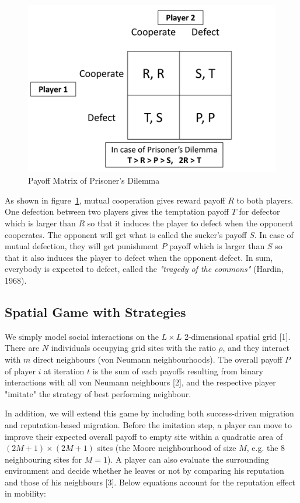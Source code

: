 \documentclass[11pt]{article}
\begin{document}
\begin{figure}[!htbp]
	\centering
	\includegraphics[scale=0.75]{../../other/pd_payoff_matrix.png}
    \caption{Payoff Matrix of Prisoner's Dilemma}
    \label{fig:paymatrix}
\end{figure}

\newpage
As shown in figure~\ref{fig:paymatrix}, mutual cooperation gives reward payoff $R$ to both players. One defection between two players gives the temptation payoff $T$ for defector which is larger than $R$ so that it induces the player to defect when the opponent cooperates. The opponent will get what is called the sucker's payoff $S$. In case of mutual defection, they will get punishment $P$ payoff which is larger than $S$ so that it also induces the player to defect when the opponent defect. In sum, everybody is expected to defect, called the \textit{"tragedy of the commons"} (Hardin, 1968).


\subsection{Spatial Game with Strategies}

We simply model social interactions on the $L \times L$ 2-dimensional spatial grid [1]. There are $N$ individuals occupying grid sites with the ratio $\rho$, and they interact with $m$ direct neighbours (von Neumann neighbourhoods). The overall payoff $P$ of player $i$ at iteration $t$ is the sum of each payoffs resulting from binary interactions with all von Neumann neighbours [2], and the respective player "imitate" the strategy of best performing neighbour.

In addition, we will extend this game by including both success-driven migration and reputation-based migration. Before the imitation step, a player can move to improve their expected overall payoff to empty site within a quadratic area of $(2M+1) \times (2M+1)$ sites (the Moore neighbourhood of size $M$, e.g. the 8 neighbouring sites for $M = 1$). A player can also evaluate the surrounding environment and decide whether he leaves or not by comparing his reputation and those of his neighbours [3]. Below equations account for the reputation effect in mobility:
\end{document}
